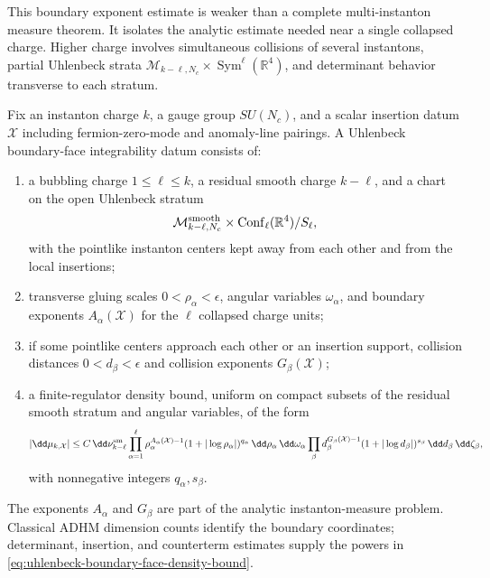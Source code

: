 This boundary exponent estimate is weaker than a complete multi-instanton
measure theorem.  It isolates the analytic estimate needed near a single
collapsed charge.  Higher charge involves simultaneous collisions of several
instantons, partial Uhlenbeck strata
\(\mathcal M_{k-\ell,N_c}\times\operatorname{Sym}^{\ell}(\mathbb R^4)\),
and determinant behavior transverse to each stratum.

\begin{definition}
\label{def:uhlenbeck-boundary-face-integrability-datum}
Fix an instanton charge \(k\), a gauge group \(SU(N_c)\), and a scalar
insertion datum \(\mathcal X\) including fermion-zero-mode and anomaly-line
pairings.  A Uhlenbeck boundary-face integrability datum consists of:
\begin{enumerate}[label=(\roman*)]
  \item a bubbling charge \(1\le \ell\le k\), a residual smooth charge
  \(k-\ell\), and a chart on the open Uhlenbeck stratum
  \[
    \mathcal M_{k-\ell,N_c}^{\rm smooth}
    \times
    \operatorname{Conf}_{\ell}(\mathbb R^4)/S_\ell ,
  \]
  with the pointlike instanton centers kept away from each other and from
  the local insertions;
  \item transverse gluing scales \(0<\rho_\alpha<\epsilon\), angular variables
  \(\omega_\alpha\), and boundary exponents \(A_\alpha(\mathcal X)\) for
  the \(\ell\) collapsed charge units;
  \item if some pointlike centers approach each other or an insertion support,
  collision distances \(0<d_\beta<\epsilon\) and collision exponents
  \(G_\beta(\mathcal X)\);
  \item a finite-regulator density bound, uniform on compact subsets of the
  residual smooth stratum and angular variables, of the form
  \begin{equation}
    |\dd\mu_{k,\mathcal X}|
    \le
    C\,\dd\nu_{k-\ell}^{\rm sm}
    \prod_{\alpha=1}^{\ell}
      \rho_\alpha^{A_\alpha(\mathcal X)-1}
      (1+|\log\rho_\alpha|)^{q_\alpha}\,
      \dd\rho_\alpha\,\dd\omega_\alpha
    \prod_{\beta}
      d_\beta^{G_\beta(\mathcal X)-1}
      (1+|\log d_\beta|)^{s_\beta}\,
      \dd d_\beta\,\dd\zeta_\beta ,
    \label{eq:uhlenbeck-boundary-face-density-bound}
  \end{equation}
  with nonnegative integers \(q_\alpha,s_\beta\).
\end{enumerate}
The exponents \(A_\alpha\) and \(G_\beta\) are part of the analytic
instanton-measure problem.  Classical ADHM dimension counts identify the
boundary coordinates; determinant, insertion, and counterterm estimates
supply the powers in
\eqref{eq:uhlenbeck-boundary-face-density-bound}.
\end{definition}

